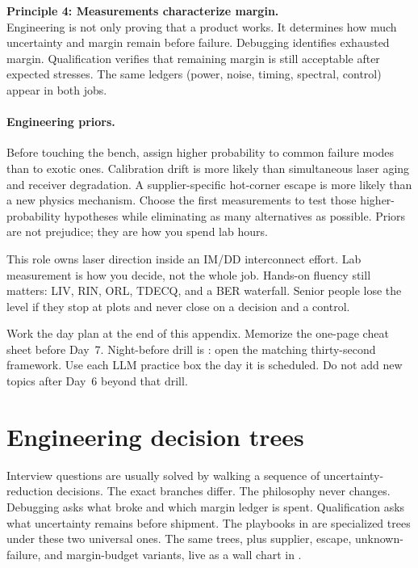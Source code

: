 \noindent\textbf{Principle 4: Measurements characterize margin.}\\
Engineering is not only proving that a product works. It determines how much
uncertainty and margin remain before failure. Debugging identifies exhausted
margin. Qualification verifies that remaining margin is still acceptable after
expected stresses. The same ledgers (power, noise, timing, spectral, control)
appear in both jobs.

\paragraph{Engineering priors.}
Before touching the bench, assign higher probability to common failure modes
than to exotic ones. Calibration drift is more likely than simultaneous laser
aging and receiver degradation. A supplier-specific hot-corner escape is more
likely than a new physics mechanism. Choose the first measurements to test
those higher-probability hypotheses while eliminating as many alternatives as
possible. Priors are not prejudice; they are how you spend lab hours.


This role owns laser direction inside an IM/DD interconnect effort. Lab
measurement is how you decide, not the whole job. Hands-on fluency still
matters: LIV, RIN, ORL, TDECQ, and a BER waterfall. Senior people lose the
level if they stop at plots and never close on a decision and a control.

Work the day plan at the end of this appendix. Memorize the one-page cheat
sheet before Day~7. Night-before drill is :
open the matching thirty-second framework. Use each LLM practice box the day
it is scheduled. Do not add new topics after Day~6 beyond that drill.

\section{Engineering decision trees}
\label{sec:interview-decision-trees}

Interview questions are usually solved by walking a sequence of
uncertainty-reduction decisions. The exact branches differ. The philosophy
never changes. Debugging asks what broke and which margin ledger is spent.
Qualification asks what uncertainty remains before shipment. The playbooks in
 are specialized trees under these two
universal ones. The same trees, plus supplier, escape, unknown-failure, and
margin-budget variants, live as a wall chart in .

